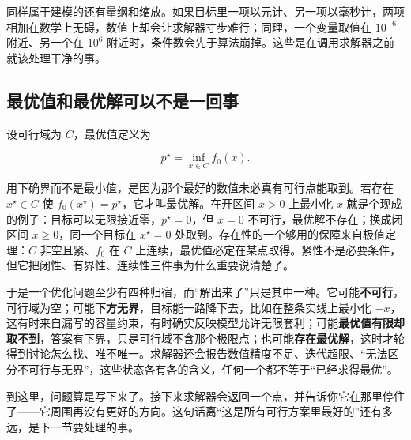 同样属于建模的还有量纲和缩放。如果目标里一项以元计、另一项以毫秒计，两项相加在数学上无碍，数值上却会让求解器寸步难行；同理，一个变量取值在 \(10^{-6}\) 附近、另一个在 \(10^{6}\) 附近时，条件数会先于算法崩掉。这些是在调用求解器之前就该处理干净的事。

\subsection{最优值和最优解可以不是一回事}

设可行域为 \(C\)，最优值定义为

\[
p^\star=\inf_{x\in C}f_0(x).
\]

用下确界而不是最小值，是因为那个最好的数值未必真有可行点能取到。若存在 \(x^\star\in C\) 使 \(f_0(x^\star)=p^\star\)，它才叫最优解。在开区间 \(x>0\) 上最小化 \(x\) 就是个现成的例子：目标可以无限接近零，\(p^\star=0\)，但 \(x=0\) 不可行，最优解不存在；换成闭区间 \(x\ge0\)，同一个目标在 \(x^\star=0\) 处取到。存在性的一个够用的保障来自极值定理：\(C\) 非空且紧、\(f_0\) 在 \(C\) 上连续，最优值必定在某点取得。紧性不是必要条件，但它把闭性、有界性、连续性三件事为什么重要说清楚了。

于是一个优化问题至少有四种归宿，而``解出来了''只是其中一种。它可能\textbf{不可行}，可行域为空；可能\textbf{下方无界}，目标能一路降下去，比如在整条实线上最小化 \(-x\)，这有时来自漏写的容量约束，有时确实反映模型允许无限套利；可能\textbf{最优值有限却取不到}，答案有下界，只是可行域不含那个极限点；也可能\textbf{存在最优解}，这时才轮得到讨论怎么找、唯不唯一。求解器还会报告数值精度不足、迭代超限、``无法区分不可行与无界''，这些状态各有各的含义，任何一个都不等于``已经求得最优''。

到这里，问题算是写下来了。接下来求解器会返回一个点，并告诉你它在那里停住了——它周围再没有更好的方向。这句话离``这是所有可行方案里最好的''还有多远，是下一节要处理的事。
